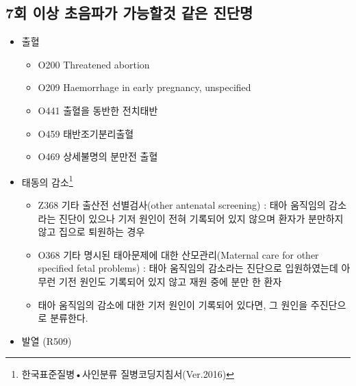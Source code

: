 \subsection*{7회 이상 초음파가 가능할것 같은 진단명}
\begin{itemize}\tightlist
\item 출혈 
	\begin{itemize}[-]\tightlist
	\item O200 Threatened abortion
	\item O209 Haemorrhage in early pregnancy, unspecified
	\item O441 출혈을 동반한 전치태반
	\item O459 태반조기분리출혈
	\item O469 상세불명의 분만전 출혈
	\end{itemize}
\item 태동의 감소\footnote{한국표준질병•사인분류 질병코딩지침서(Ver.2016)}
	\begin{itemize}[-]\tightlist
	\item Z368 기타 출산전 선별검사(other antenatal screening) : 태아 움직임의 감소라는 진단이 있으나 기저 원인이 전혀 기록되어 있지 않으며 환자가 분만하지 않고 집으로 퇴원하는 경우
	\item O368 기타 명시된 태아문제에 대한 산모관리(Maternal care for other specified fetal problems) : 태아 움직임의 감소라는 진단으로 입원하였는데 아무런 기전 원인도 기록되어 있지 않고 재원 중에 분만 한 환자
	\item 태아 움직임의 감소에 대한 기저 원인이 기록되어 있다면, 그 원인을 주진단으로 분류한다.
	\end{itemize}	
\item 발열 (R509)
	\begin{itemize}[-]\tightlist

\end{itemize}
\end{itemize}

